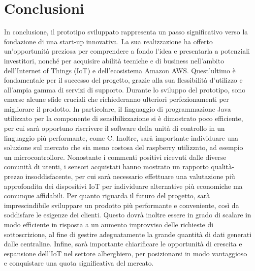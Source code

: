 \section{Conclusioni}
In conclusione, il prototipo sviluppato rappresenta un passo significativo verso la fondazione di una start-up innovativa. La sua realizzazione ha offerto un'opportunità preziosa per comprendere a fondo l'idea e presentarla a potenziali investitori, nonché per acquisire abilità tecniche e di business nell'ambito dell'Internet of Things (IoT) e dell'ecosistema Amazon AWS. Quest'ultimo è fondamentale per il successo del progetto, grazie alla sua flessibilità d'utilizzo e all'ampia gamma di servizi di supporto.
%
Durante lo sviluppo del prototipo, sono emerse alcune sfide cruciali che richiederanno ulteriori perfezionamenti per migliorare il prodotto. In particolare, il linguaggio di programmazione Java utilizzato per la componente di sensibilizzazione si è dimostrato poco efficiente, per cui sarà opportuno riscrivere il software della unità di controllo in un linguaggio più performante, come C. Inoltre, sarà importante individuare una soluzione sul mercato che sia meno costosa del raspberry utilizzato, ad esempio un microcontrollore.
%
Nonostante i commenti positivi ricevuti dalle diverse comunità di utenti, i sensori acquistati hanno mostrato un rapporto qualità-prezzo insoddisfacente, per cui sarà necessario effettuare una valutazione più approfondita dei dispositivi IoT per individuare alternative più economiche ma comunque affidabili.
%
Per quanto riguarda il futuro del progetto, sarà imprescindibile sviluppare un prodotto più performante e conveniente, così da soddisfare le esigenze dei clienti. Questo dovrà inoltre essere in grado di scalare in modo efficiente in risposta a un aumento improvviso delle richieste di sottoscrizione, al fine di gestire adeguatamente la grande quantità di dati generati dalle centraline.
%
Infine, sarà importante chiarificare le opportunità di crescita e espansione dell'IoT nel settore alberghiero, per posizionarsi in modo vantaggioso e conquistare una quota significativa del mercato.
